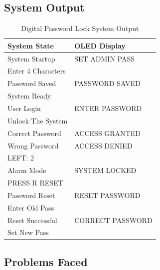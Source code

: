 
\subsection{System Output}

\begin{table}[H]
\centering
\caption{Digital Password Lock System Output}
\label{tab:password_output}

\begin{tabular}{|p{5cm}|p{7.5cm}|}
\hline
\textbf{System State} & \textbf{OLED Display} \\
\hline
System Startup & SET ADMIN PASS \\ Enter 4 Characters \\
\hline
Password Saved & PASSWORD SAVED \\ System Ready \\
\hline
User Login & ENTER PASSWORD \\ Unlock The System \\
\hline
Correct Password & ACCESS GRANTED \\
\hline
Wrong Password & ACCESS DENIED \\ LEFT: 2 \\
\hline
Alarm Mode & SYSTEM LOCKED \\ PRESS R RESET \\
\hline
Password Reset & RESET PASSWORD \\ Enter Old Pass \\
\hline
Reset Successful & CORRECT PASSWORD \\ Set New Pass \\
\hline
\end{tabular}

\end{table}


\subsection{Problems Faced}

